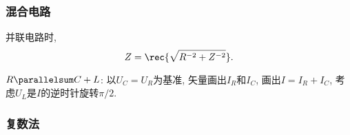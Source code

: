 \documentclass[hidelinks]{ctexart}
\begin{document}

\subsubsection{混合电路} %
\label{ssub:混合电路}   

并联电路时,
\[ Z= \rec{\sqrt{R^{-2} + Z^{-2}}}. \]
\begin{ex}
    $R\parallelsum C + L$: 以$U_C=U_R$为基准, 矢量画出$I_R$和$I_C$, 画出$I = I_R+I_C$, 考虑$U_L$是$I$的逆时针旋转$\pi/2$.
\end{ex}


\subsubsection{复数法} %
\label{ssub:复数法}
\end{document}
